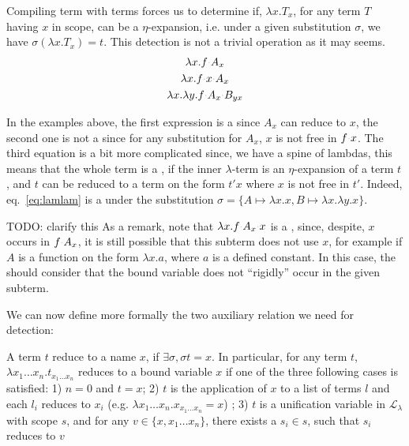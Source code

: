 \documentclass[sigconf,natbib=false,review]{acmart}
\newcommand{\appsep}{\ensuremath{\textcolor{lightgray}{\cdot}}}
\newcommand{\llambda}{\ensuremath{\mathcal{L}_\lambda}\xspace}
\begin{document}
Compiling term with \maybeeta terms forces us to determine if, $\lambda x. T_x$,
for any term $T$ having $x$ in scope, can be a $\eta$-expansion, i.e. under a
given substitution $\sigma$, we have $\sigma (\lambda x.T_x) = t$. This
\maybeeta detection is not a trivial operation as it may seems.
%
\begin{gather}
  \lambda x. f \appsep A_x\\
  \lambda x. f \appsep x \appsep A_x\\
  \lambda x. \lambda y. f \appsep A_x \appsep B_{y x} \label{eq:lamlam}
\end{gather}

In the examples above, the first expression is a \maybeeta since $A_x$ can
reduce to $x$, the second one is not a \maybeeta since for any substitution for
$A_x$, $x$ is not free in $f \appsep x$. The third equation is a bit more
complicated since, we have a spine of lambdas, this means that the whole term
is a \maybeeta, if the inner $\lambda$-term is an $\eta$-expansion of a term
$t$, and $t$ can be reduced to a term on the form $t' x$ where $x$ is not free
in $t'$. Indeed, eq.~\ref{eq:lamlam} is a \maybeeta under the substitution 
$\sigma = \{A \mapsto \lambda x.x, B \mapsto \lambda x. \lambda y. x\}$.

TODO: clarify this
As a remark, note that $\lambda x. f \appsep A_x \appsep x$ is a \maybeeta,
since, despite, $x$ occurs in $f \appsep A_x$, it is still possible that this
subterm does not use $x$, for example if $A$ is a function on the form $\lambda
x.a$, where $a$ is a defined constant. In this case, the \maybeeta should
consider that the bound variable  does not ``rigidly'' occur in 
the given subterm.

We can now define more formally the two auxiliary relation we need for \maybeeta
detection:

\begin{definition}[reduce-to]
  A term $t$ reduce to a name $x$, if $\exists \sigma, \sigma t = x$. In
  particular, for any term $t$, $\lambda x_1 \ldots x_n.t_{x_1\ldots x_n}$
  reduces to a bound variable $x$ if one of the three following cases is
  satisfied: 1) $n = 0$ and $t = x$; 2) $t$ is the application of $x$ to a list
  of terms $l$ and each $l_i$ reduces to $x_i$
  (e.g. $\lambda x_1 \ldots x_n.x_{x_1\ldots x_n} = x$) ; 3) $t$ is a unification
  variable in \llambda with scope
  $s$, and for any $v \in \{ x, x_1 \ldots x_n \}$,
  there exists a $s_i \in s$, such that $s_i$ reduces to $v$
\end{definition}
\end{document}
